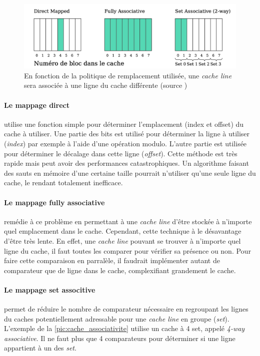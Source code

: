 \begin{figure}
    \center
    \includegraphics[width=12cm]{images/cache_associativite.png}
    \caption{\label{pic:cache_associativite} En fonction de la politique de remplacement utilisée, une \textit{cache line} sera associée à une ligne du cache différente (source \cite{Meunier2017})}
\end{figure}

\paragraph{Le mappage direct} utilise une fonction simple pour déterminer l'emplacement (index et offset) du cache à utiliser. Une partie des bits est utilisé pour déterminer la ligne à utiliser (\textit{index}) par exemple à l'aide d'une opération modulo. L'autre partie est utilisée pour déterminer le décalage dans cette ligne (\textit{offset}). Cette méthode est très rapide mais peut avoir des performances catastrophiques. Un algorithme faisant des sauts en mémoire d'une certaine taille pourrait n'utiliser qu'une seule ligne du cache, le rendant totalement inefficace.

\paragraph{Le mappage fully associative} remédie à ce problème en permettant à une \textit{cache line} d'être stockée à n'importe quel emplacement dans le cache. Cependant, cette technique à le désavantage d'être très lente. En effet, une \textit{cache line} pouvant se trouver à n'importe quel ligne du cache, il faut toutes les comparer pour vérifier sa présence ou non. Pour faire cette comparaison en parralèle, il faudrait implémenter autant de comparateur que de ligne dans le cache, complexifiant grandement le cache.


\paragraph{Le mappage set associtive } permet de réduire le nombre de comparateur nécessaire en regroupant les lignes du caches potentiellement adressable pour une \textit{cache line} en groupe (\textit{set}). L'exemple de la \autoref{pic:cache_associativite} utilise un cache à 4 set, appelé \textit{4-way associative}. Il ne faut plus que 4 comparateurs pour déterminer si une ligne appartient à un des \textit{set}.


